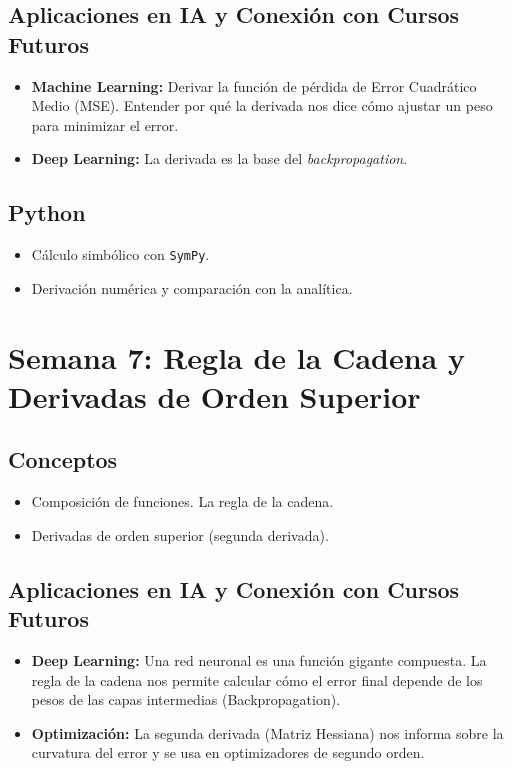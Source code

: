 \documentclass[12pt,a4paper,openany,oneside]{book}
\begin{document}
\subsection{Aplicaciones en IA y Conexión con Cursos Futuros}
\begin{itemize}
    \item \textbf{Machine Learning:} Derivar la función de pérdida de Error Cuadrático Medio (MSE). Entender por qué la derivada nos dice cómo ajustar un peso para minimizar el error.
    \item \textbf{Deep Learning:} La derivada es la base del \textit{backpropagation}.
\end{itemize}

\subsection{Python}
\begin{itemize}
    \item Cálculo simbólico con \texttt{SymPy}.
    \item Derivación numérica y comparación con la analítica.
\end{itemize}

\section{Semana 7: Regla de la Cadena y Derivadas de Orden Superior}

\subsection{Conceptos}
\begin{itemize}
    \item Composición de funciones. La regla de la cadena.
    \item Derivadas de orden superior (segunda derivada).
\end{itemize}

\subsection{Aplicaciones en IA y Conexión con Cursos Futuros}
\begin{itemize}
    \item \textbf{Deep Learning:} Una red neuronal es una función gigante compuesta. La regla de la cadena nos permite calcular cómo el error final depende de los pesos de las capas intermedias (Backpropagation).
    \item \textbf{Optimización:} La segunda derivada (Matriz Hessiana) nos informa sobre la curvatura del error y se usa en optimizadores de segundo orden.
\end{itemize}
\end{document}
